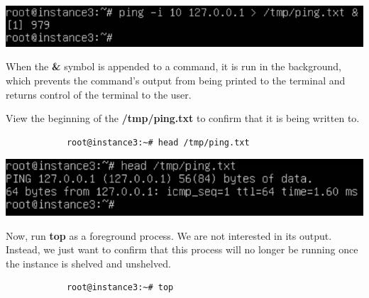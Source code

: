 \documentclass[letterpaper, 12pt]{article}
\begin{document}
\begin{enumerate}
\begin{labstep}
        \begin{center}
            \includegraphics[width=\linewidth]{images/part5/step7.png}
        \end{center}
    \end{labstep}

    \begin{notebox}
        When the \textbf{\&} symbol is appended to a command, it is run in the background, which prevents the command's output from being printed to the terminal and returns control of the terminal to the user.
    \end{notebox}

    \begin{labstep}
        View the beginning of the \textbf{/tmp/ping.txt} to confirm that it is being written to.
        \begin{lstlisting}
            root@instance3:~# head /tmp/ping.txt
        \end{lstlisting}

        \begin{center}
            \includegraphics[width=\linewidth]{images/part5/step8.png}
        \end{center}
    \end{labstep}

    \begin{labstep}
        Now, run \textbf{top} as a foreground process.
        We are not interested in its output.
        Instead, we just want to confirm that this process will no longer be running once the instance is shelved and unshelved.
        \begin{lstlisting}
            root@instance3:~# top
        \end{lstlisting}


\end{labstep}
\end{enumerate}
\end{document}
